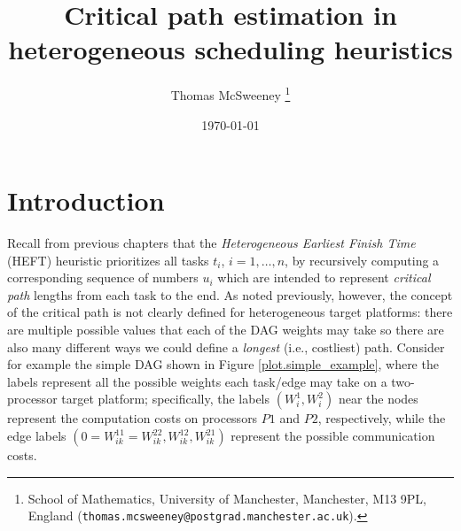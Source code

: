 \documentclass[12pt]{article}
\title{Critical path estimation in heterogeneous scheduling heuristics} %
\author{Thomas McSweeney%
	\thanks{%
		School of Mathematics,
		University of Manchester,
		Manchester, M13 9PL, England
		(\texttt{thomas.mcsweeney@postgrad.manchester.ac.uk}).
	}
}
\date{\today}
\begin{document}
	\maketitle 	


\section{Introduction}
\label{sect.intro}


Recall from previous chapters that the {\em Heterogeneous Earliest Finish Time} (HEFT) heuristic prioritizes all tasks $t_i$, $i = 1, \dots, n$, by recursively computing a corresponding sequence of numbers $u_i$ which are intended to represent {\em critical path} lengths from each task to the end. As noted previously, however, the concept of the critical path is not clearly defined for heterogeneous target platforms: there are multiple possible values that each of the DAG weights may take so there are also many different ways we could define a {\em longest} (i.e., costliest) path. Consider for example the simple DAG shown in Figure \ref{plot.simple_example}, where the labels represent all the possible weights each task/edge may take on a two-processor target platform; specifically, the labels $(W_i^1, W_i^2)$ near the nodes represent the computation costs on processors $P1$ and $P2$, respectively, while the edge labels $(0 = W_{ik}^{11} = W_{ik}^{22}, W_{ik}^{12}, W_{ik}^{21})$ represent the possible communication costs.  
\end{document}
